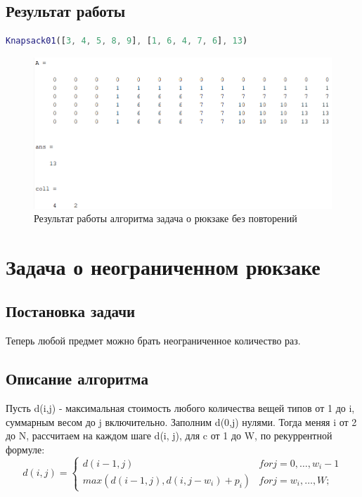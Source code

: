 \documentclass{article}
\begin{document}
\subsection{Результат работы}
\begin{lstlisting}[language={Matlab}, caption={Тест. Задача о рюкзаке без повторений}, label={Script}]
Knapsack01([3, 4, 5, 8, 9], [1, 6, 4, 7, 6], 13)
\end{lstlisting}
\begin{figure}[h]
	\centering
	\includegraphics[width=0.75\linewidth]{Knapsack01.png}
	\caption{Результат работы алгоритма задача о рюкзаке без повторений}
\end{figure}
\section{Задача о неограниченном рюкзаке}
\subsection{Постановка задачи}
Теперь любой предмет можно брать неограниченное количество раз.
\subsection{Описание алгоритма}
Пусть d(i,j) - максимальная стоимость любого количества вещей типов от 1 до i, суммарным весом до j включительно.
Заполним d(0,j) нулями.
Тогда меняя i от 2 до N, рассчитаем на каждом шаге d(i, j), для c от 1 до W, по рекуррентной формуле:
\begin{equation}
d(i, j)=\begin{cases}
d(i - 1, j) & for j = 0, \ldots , w_{i} - 1\\
max(d(i - 1, j), d(i, j - w_{i}) + p_{i}) & for j = w_{i}, \ldots , W;
\end{cases}
\end{equation}
\end{document}
